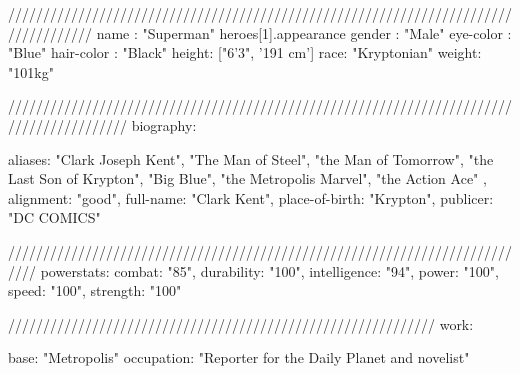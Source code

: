 
////////////////////////////////////////////////////////////////////////////////////
name : "Superman"
heroes[1].appearance
{
    gender : "Male"
    eye-color : "Blue"
    hair-color : "Black"
    height: ["6'3", '191 cm']
    race: "Kryptonian"
    weight: "101kg"
}


/////////////////////////////////////////////////////////////////////////////////////////
biography: {

    aliases: {
        "Clark Joseph Kent",
        "The Man of Steel",
        "the Man of Tomorrow",
        "the Last Son of Krypton",
        "Big Blue",
        "the Metropolis Marvel",
        "the Action Ace"
    },
    alignment: "good",
    full-name: "Clark Kent",
    place-of-birth: "Krypton",
    publicer: "DC COMICS"
}
    
    ////////////////////////////////////////////////////////////////////////////
powerstats: {
    combat: "85",
    durability: "100",
    intelligence: "94",
    power: "100",
    speed: "100",
    strength: "100"
} 

/////////////////////////////////////////////////////////////
work:{

    base: "Metropolis"
    occupation: "Reporter for the Daily Planet and novelist"
} 